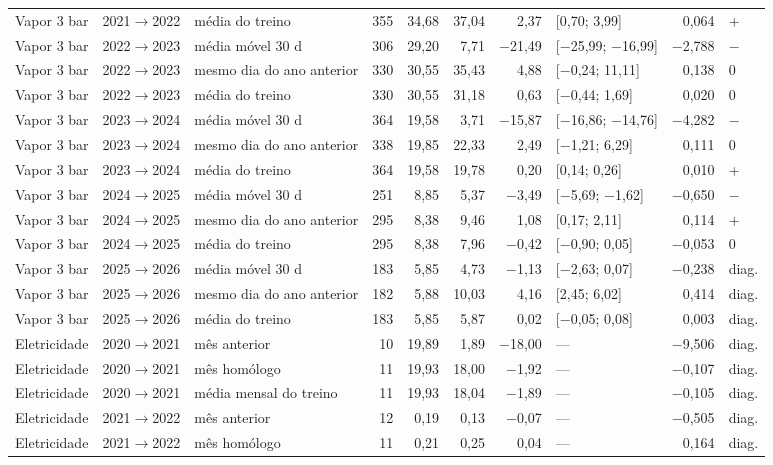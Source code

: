 {\begin{xltabular}{\linewidth}{@{}llp{2.4cm}rrrrlrl@{}}
Vapor 3 bar & 2021$\to$2022 & média do treino & 355 & 34,68 & 37,04 & 2,37 & [0,70; 3,99] & 0,064 & + \\
Vapor 3 bar & 2022$\to$2023 & média móvel 30 d & 306 & 29,20 & 7,71 & $-$21,49 & [$-$25,99; $-$16,99] & $-$2,788 & $-$ \\
Vapor 3 bar & 2022$\to$2023 & mesmo dia do ano anterior & 330 & 30,55 & 35,43 & 4,88 & [$-$0,24; 11,11] & 0,138 & 0 \\
Vapor 3 bar & 2022$\to$2023 & média do treino & 330 & 30,55 & 31,18 & 0,63 & [$-$0,44; 1,69] & 0,020 & 0 \\
Vapor 3 bar & 2023$\to$2024 & média móvel 30 d & 364 & 19,58 & 3,71 & $-$15,87 & [$-$16,86; $-$14,76] & $-$4,282 & $-$ \\
Vapor 3 bar & 2023$\to$2024 & mesmo dia do ano anterior & 338 & 19,85 & 22,33 & 2,49 & [$-$1,21; 6,29] & 0,111 & 0 \\
Vapor 3 bar & 2023$\to$2024 & média do treino & 364 & 19,58 & 19,78 & 0,20 & [0,14; 0,26] & 0,010 & + \\
Vapor 3 bar & 2024$\to$2025 & média móvel 30 d & 251 & 8,85 & 5,37 & $-$3,49 & [$-$5,69; $-$1,62] & $-$0,650 & $-$ \\
Vapor 3 bar & 2024$\to$2025 & mesmo dia do ano anterior & 295 & 8,38 & 9,46 & 1,08 & [0,17; 2,11] & 0,114 & + \\
Vapor 3 bar & 2024$\to$2025 & média do treino & 295 & 8,38 & 7,96 & $-$0,42 & [$-$0,90; 0,05] & $-$0,053 & 0 \\
Vapor 3 bar & 2025$\to$2026 & média móvel 30 d & 183 & 5,85 & 4,73 & $-$1,13 & [$-$2,63; 0,07] & $-$0,238 & diag. \\
Vapor 3 bar & 2025$\to$2026 & mesmo dia do ano anterior & 182 & 5,88 & 10,03 & 4,16 & [2,45; 6,02] & 0,414 & diag. \\
Vapor 3 bar & 2025$\to$2026 & média do treino & 183 & 5,85 & 5,87 & 0,02 & [$-$0,05; 0,08] & 0,003 & diag. \\
Eletricidade & 2020$\to$2021 & mês anterior & 10 & 19,89 & 1,89 & $-$18,00 & --- & $-$9,506 & diag. \\
Eletricidade & 2020$\to$2021 & mês homólogo & 11 & 19,93 & 18,00 & $-$1,92 & --- & $-$0,107 & diag. \\
Eletricidade & 2020$\to$2021 & média mensal do treino & 11 & 19,93 & 18,04 & $-$1,89 & --- & $-$0,105 & diag. \\
Eletricidade & 2021$\to$2022 & mês anterior & 12 & 0,19 & 0,13 & $-$0,07 & --- & $-$0,505 & diag. \\
Eletricidade & 2021$\to$2022 & mês homólogo & 11 & 0,21 & 0,25 & 0,04 & --- & 0,164 & diag. \\

\end{xltabular}}
